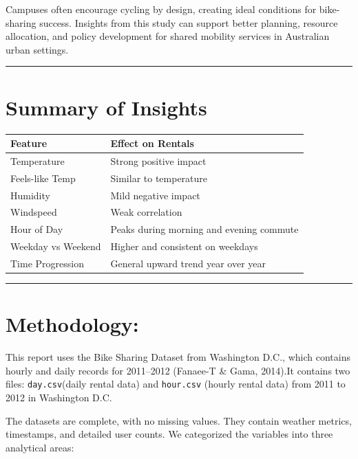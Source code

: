 \documentclass[
  12pt,
]{article}
\begin{document}
Campuses often encourage cycling by design, creating ideal conditions
for bike-sharing success. Insights from this study can support better
planning, resource allocation, and policy development for shared
mobility services in Australian urban settings.

\begin{center}\rule{0.5\linewidth}{0.5pt}\end{center}

\section{Summary of Insights}\label{summary-of-insights}

\begin{longtable}[]{@{}ll@{}}
\toprule\noalign{}
Feature & Effect on Rentals \\
\midrule\noalign{}
\endhead
\bottomrule\noalign{}
\endlastfoot
Temperature & Strong positive impact \\
Feels-like Temp & Similar to temperature \\
Humidity & Mild negative impact \\
Windspeed & Weak correlation \\
Hour of Day & Peaks during morning and evening commute \\
Weekday vs Weekend & Higher and consistent on weekdays \\
Time Progression & General upward trend year over year \\
\end{longtable}

\begin{center}\rule{0.5\linewidth}{0.5pt}\end{center}

\section{Methodology:}\label{methodology}

This report uses the Bike Sharing Dataset from Washington D.C., which
contains hourly and daily records for 2011--2012 (Fanaee-T \& Gama,
2014).It contains two files: \texttt{day.csv}(daily rental data) and
\texttt{hour.csv} (hourly rental data) from 2011 to 2012 in Washington
D.C.

The datasets are complete, with no missing values. They contain weather
metrics, timestamps, and detailed user counts. We categorized the
variables into three analytical areas:
\end{document}
